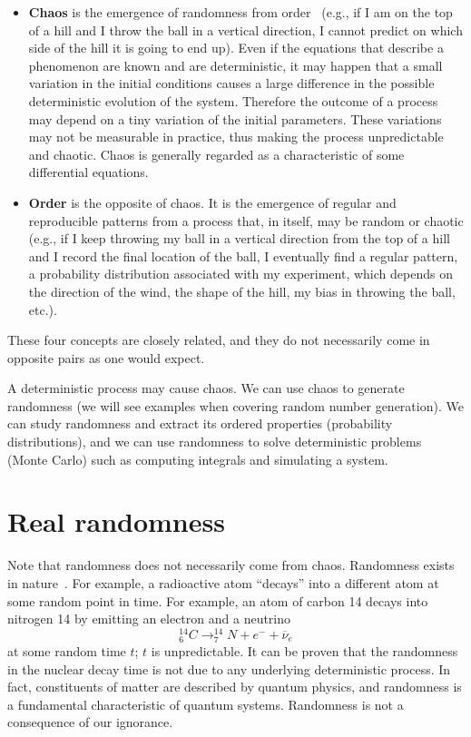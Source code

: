 \documentclass[justified, sixbynine]{tufte-book}
\theoremstyle{plain}%
\newtheorem * {corollary}{Corollary}
\theoremstyle{definition}
\theoremstyle{remark}
\newtheorem * {remark}{Remark}
\newtheorem * {note}{Note}
\begin{document}
\begin{fullwidth}
\begin{itemize}
\item  {\bf Chaos} is the emergence of randomness from order~\cite{lorenz}
(e.g., if I am on the
top of a hill and I throw the ball in a vertical direction, I cannot predict on
which side of the hill it is going to end up). Even if the equations that
describe a phenomenon are known and are deterministic, it may happen that a
small variation in the initial conditions causes a large difference in the
possible deterministic evolution of the system. Therefore the outcome of a
process may depend on a tiny variation of the initial parameters. These
variations may not be measurable in practice, thus making the process
unpredictable and chaotic. Chaos is generally regarded as a characteristic
of some differential equations.

\item  {\bf Order} is the opposite of chaos. It is the emergence of regular
and reproducible patterns from a process that, in itself, may be random or
chaotic (e.g., if I keep throwing my ball in a vertical direction from
the top of a hill and I record the final location of the ball, I eventually
find a regular pattern, a probability distribution associated with my
experiment, which depends on the direction of the wind, the shape of the
hill, my bias in throwing the ball, etc.).
\end{itemize}

These four concepts are closely related, and they do not necessarily come in
opposite pairs as one would expect.

A deterministic process may cause chaos. We can use chaos to generate
randomness (we will see examples when covering random number generation). We
can study randomness and extract its ordered properties (probability
distributions), and we can use randomness to solve deterministic problems
(Monte Carlo) such as computing integrals and simulating a system.

\goodbreak\section{Real randomness}

Note that randomness does not necessarily come from chaos.
Randomness exists in nature~\cite{determinism}\cite{decay}.
For example, a radioactive atom ``decays'' into a different atom
at some random point in time. For example, an atom of carbon 14 decays into nitrogen 14 by emitting an electron and a neutrino
\begin{equation}
_6^{14}C\longrightarrow _7^{14}N+e^{-}+\overline{\nu }_e
\end{equation}
at some random time $t$; $t$ is unpredictable. It can be proven that the
randomness in the nuclear decay time is not due to any underlying
deterministic process. In fact, constituents of matter are
described by quantum physics, and randomness is a fundamental characteristic
of quantum systems. Randomness is not a consequence of our ignorance.


\end{fullwidth}
\end{document}

